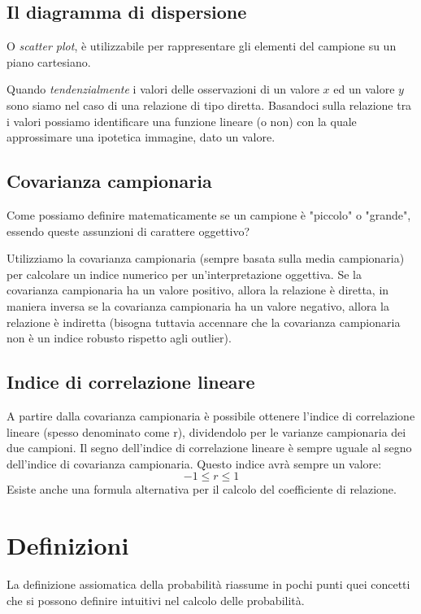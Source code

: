 \subsection{Il diagramma di dispersione}
O \emph{scatter plot}, è utilizzabile per rappresentare gli elementi del campione su un piano cartesiano. %

Quando \emph{tendenzialmente} i valori delle osservazioni di un valore $x$ ed un valore $y$ sono siamo nel caso di una relazione di tipo diretta. Basandoci sulla relazione tra i valori possiamo identificare una funzione lineare (o non) con la quale approssimare una ipotetica immagine, dato un valore. 

\subsection{Covarianza campionaria}
Come possiamo definire matematicamente se un campione è "piccolo" o "grande", essendo queste assunzioni di carattere oggettivo? 

Utilizziamo la covarianza campionaria (sempre basata sulla media campionaria) per calcolare un indice numerico per un'interpretazione oggettiva. Se la covarianza campionaria ha un valore positivo, allora la relazione è diretta, in maniera inversa se la covarianza campionaria ha un valore negativo, allora la relazione è indiretta (bisogna tuttavia accennare che la covarianza campionaria non è un indice robusto rispetto agli outlier).

\subsection{Indice di correlazione lineare}
A partire dalla covarianza campionaria è possibile ottenere l'indice di correlazione lineare (spesso denominato come r), dividendolo per le varianze campionaria dei due campioni. Il segno dell'indice di correlazione lineare è sempre uguale al segno dell'indice di covarianza campionaria. Questo indice avrà sempre un valore:
\begin{equation*}
		-1 \leq r \leq 1
	\end{equation*}
Esiste anche una formula alternativa per il calcolo del coefficiente di relazione. %

\section{Definizioni}
La definizione assiomatica della probabilità riassume in pochi punti quei concetti che si possono definire intuitivi nel calcolo delle probabilità.

